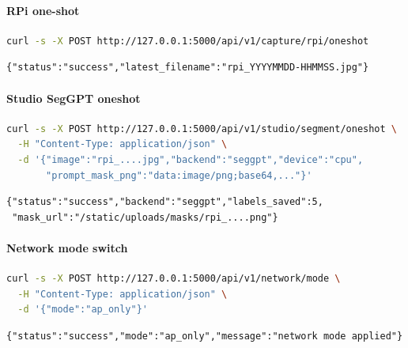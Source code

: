 \paragraph{RPi one-shot}
\begin{lstlisting}[language=bash]
curl -s -X POST http://127.0.0.1:5000/api/v1/capture/rpi/oneshot
\end{lstlisting}
\begin{lstlisting}
{"status":"success","latest_filename":"rpi_YYYYMMDD-HHMMSS.jpg"}
\end{lstlisting}

\paragraph{Studio SegGPT oneshot}
\begin{lstlisting}[language=bash]
curl -s -X POST http://127.0.0.1:5000/api/v1/studio/segment/oneshot \
  -H "Content-Type: application/json" \
  -d '{"image":"rpi_....jpg","backend":"seggpt","device":"cpu",
       "prompt_mask_png":"data:image/png;base64,..."}'
\end{lstlisting}
\begin{lstlisting}
{"status":"success","backend":"seggpt","labels_saved":5,
 "mask_url":"/static/uploads/masks/rpi_....png"}
\end{lstlisting}

\paragraph{Network mode switch}
\begin{lstlisting}[language=bash]
curl -s -X POST http://127.0.0.1:5000/api/v1/network/mode \
  -H "Content-Type: application/json" \
  -d '{"mode":"ap_only"}'
\end{lstlisting}
\begin{lstlisting}
{"status":"success","mode":"ap_only","message":"network mode applied"}
\end{lstlisting}

